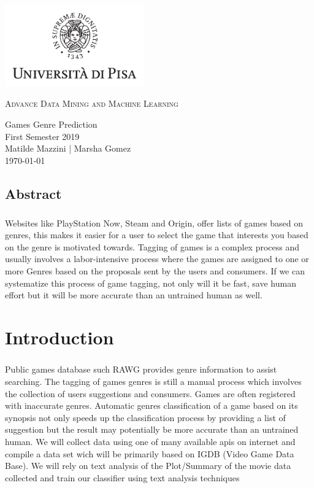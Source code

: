 \documentclass{book}
\author{Matilde Mazzini | Marsha Gomez Gomez}
\begin{document}
\begin{titlepage}
    \centering
    \includegraphics[width=6cm]{unipi}
    \vfill
    \vspace{1.5cm}
    {\huge\textsc{Advance Data Mining and Machine Learning}\par}
    {\Large
        Games Genre Prediction\\
        First Semester 2019\\
        \vskip2cm
        Matilde Mazzini | Marsha Gomez\\
        \vskip2cm
        \today
    }    
    \vfill
    \vfill
\end{titlepage}
    \tableofcontents
    
    
    \section*{Abstract}
    \paragraph{}
    Websites like PlayStation Now, Steam and Origin, offer lists of games based on genres, this makes it easier for a user to select the game that interests you based on the genre is motivated towards. Tagging of games is a complex process and usually involves a labor-intensive process where the games are assigned to one or more Genres based on the proposals sent by the users and consumers. If we can systematize this process of game tagging, not only will it be fast, save human effort but it will be more accurate than an untrained human as well.

    \chapter{Introduction}
    \paragraph{}
    Public games database such RAWG provides genre information to assist searching. The tagging of games genres is still a manual process which involves the collection of users suggestions and consumers. Games are often registered with inaccurate genres. Automatic genres classification of a game based on its synopsis not only speeds up the classification process by providing a list of suggestion but the result may potentially be more accurate than an untrained human. We will collect data using one of many available apis on internet and compile a data set wich will be primarily based on IGDB (Video Game Data Base). We will rely on text analysis of the Plot/Summary of the movie data collected and train our classifier using text analysis techniques
\end{document}
